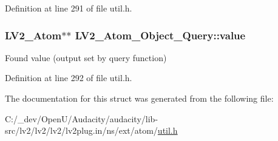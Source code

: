 Definition at line 291 of file util.\+h.

\subsubsection[{\texorpdfstring{value}{value}}]{ {\bf L\+V2\+\_\+\+Atom}$\ast$$\ast$ L\+V2\+\_\+\+Atom\+\_\+\+Object\+\_\+\+Query\+::value}\hypertarget{struct_l_v2___atom___object___query_a0101d002fae056768c3fed36f1b564e0}{}\label{struct_l_v2___atom___object___query_a0101d002fae056768c3fed36f1b564e0}
Found value (output set by query function) 

Definition at line 292 of file util.\+h.



The documentation for this struct was generated from the following file\+:\begin{DoxyCompactItemize}
\item 
C\+:/\+\_\+dev/\+Open\+U/\+Audacity/audacity/lib-\/src/lv2/lv2/lv2/lv2plug.\+in/ns/ext/atom/\hyperlink{lv2_2lv2_2lv2_2lv2plug_8in_2ns_2ext_2atom_2util_8h}{util.\+h}\end{DoxyCompactItemize}
